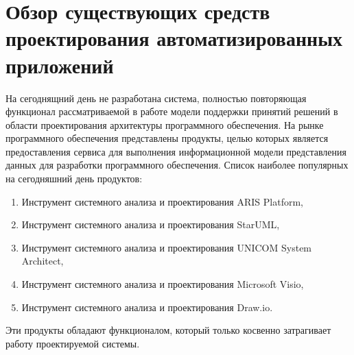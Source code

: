 \section{Обзор существующих средств проектирования автоматизированных приложений}\label{sec:ch1/sec6}
На сегоднящний день не разработана система, полностью повторяющая функционал рассматриваемой в работе модели поддержки принятий решений в области проектирования архитектуры программного обеспечения. На рынке программного обеспечения представлены продукты, целью которых является предоставления сервиса для выполнения информационной модели представления данных для разработки программного обеспечения.
Список наиболее популярных на сегодняшний день продуктов:
\begin{enumerate}
    \item Инструмент системного анализа и проектирования ARIS Platform,
    \item Инструмент системного анализа и проектирования StarUML,
    \item Инструмент системного анализа и проектирования UNICOM System Architect,
    \item Инструмент системного анализа и проектирования Microsoft Visio,
    \item Инструмент системного анализа и проектирования Draw.io.
\end{enumerate} 
Эти продукты обладают функционалом, который только косвенно затрагивает работу проектируемой системы.


